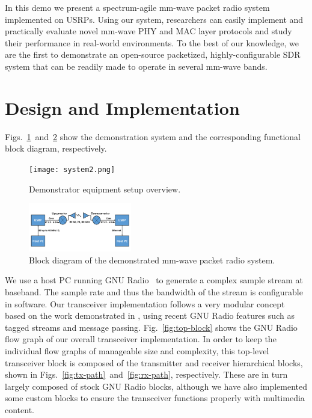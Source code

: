 \documentclass{sig-alternate}
\begin{document}
In this demo we present a spectrum-agile mm-wave packet radio system implemented on USRPs. Using our system, researchers can easily implement and practically evaluate novel mm-wave PHY and MAC layer protocols and study their performance in real-world environments. To the best of our knowledge, we are the first to demonstrate an open-source packetized, highly-configurable SDR system that can be readily made to operate in several mm-wave bands.

\section{Design and Implementation}
Figs.~\ref{fig:system}~and~\ref{fig:block} show the demonstration system and the corresponding functional block diagram, respectively.
\begin{figure}[!tb]
\center
\texttt{[image: system2.png]}
\caption{Demonstrator equipment setup overview.}
\label{fig:system}
\end{figure}
\begin{figure}[!tb]
\center
\includegraphics[width=0.4\textwidth]{block-diagram}
\caption{Block diagram of the demonstrated mm-wave packet radio system.}
\label{fig:block}
\end{figure}
We use a host PC running GNU Radio~\cite{gnuradio} to generate a complex sample stream at baseband. The sample rate and thus the bandwidth of the stream is configurable in software. Our transceiver implementation follows a very modular concept based on the work demonstrated in \cite{Malsbury:phymac}, using recent GNU Radio features such as tagged streams and message passing. Fig.~\ref{fig:top-block} shows the GNU Radio flow graph of our overall transceiver implementation. In order to keep the individual flow graphs of manageable size and complexity, this top-level transceiver block is composed of the transmitter and receiver hierarchical blocks, shown in Figs.~\ref{fig:tx-path}~and~\ref{fig:rx-path}, respectively. These are in turn largely composed of stock GNU Radio blocks, although we have also implemented some custom blocks to ensure the transceiver functions properly with multimedia content.
\end{document}
